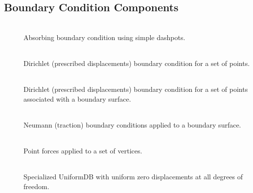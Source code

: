 \subsection{Boundary Condition Components}
\begin{description}
\item [] \\
Absorbing boundary condition using simple dashpots.
\item [] \\
Dirichlet (prescribed displacements) boundary condition for a set
of points.
\item [] \\
Dirichlet (prescribed displacements) boundary condition for a set
of points associated with a boundary surface.
\item [] \\
Neumann (traction) boundary conditions applied to a boundary surface.
\item [] \\
Point forces applied to a set of vertices.
\item [] \\
Specialized UniformDB with uniform zero displacements at all degrees
of freedom.
\end{description}

